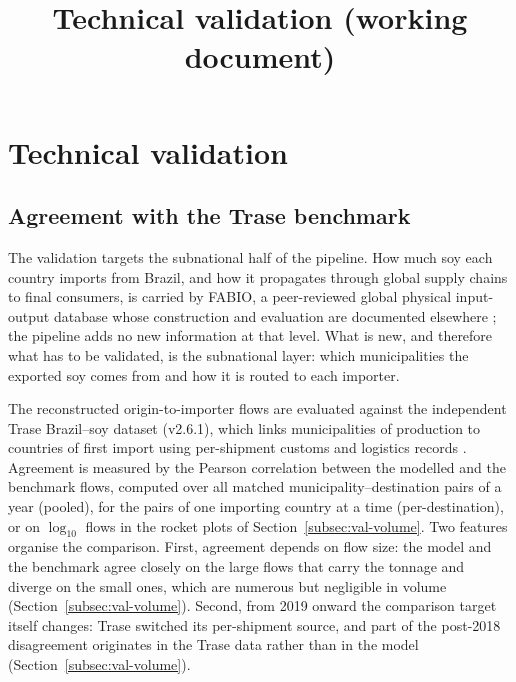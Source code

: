 \documentclass[pdflatex,sn-nature]{sn-jnl}%
\begin{document}
\title[Technical validation]{Technical validation (working document)}

\author*[1]{ }



\maketitle

\section{Technical validation}\label{sec:validation}

\subsection{Agreement with the Trase benchmark}\label{subsec:val-trase}
The validation targets the subnational half of the pipeline. How much
soy each country imports from Brazil, and how it propagates through
global supply chains to final consumers, is carried by FABIO, a
peer-reviewed global physical input-output database whose construction
and evaluation are documented elsewhere \cite{bruckner2019fabio}; the
pipeline adds no new information at that level. What is new, and
therefore what has to be validated, is the subnational layer: which
municipalities the exported soy comes from and how it is routed to
each importer.

The reconstructed origin-to-importer flows are evaluated against the
independent Trase Brazil--soy dataset (v2.6.1), which links
municipalities of production to countries of first import using
per-shipment customs and logistics records
\cite{godar2015sei,escobar2020trase}. Agreement is measured by the
Pearson correlation between the modelled and the benchmark flows,
computed over all matched municipality--destination pairs of a year
(pooled), for the pairs of one importing country at a time
(per-destination), or on $\log_{10}$ flows in the rocket plots of
Section~\ref{subsec:val-volume}. Two features organise the comparison.
First, agreement depends on flow size: the model and the benchmark
agree closely on the large flows that carry the tonnage and diverge on
the small ones, which are numerous but negligible in volume
(Section~\ref{subsec:val-volume}). Second, from 2019 onward the
comparison target itself changes: Trase switched its per-shipment
source, and part of the post-2018 disagreement originates in the Trase
data rather than in the model (Section~\ref{subsec:val-volume}).
\end{document}
